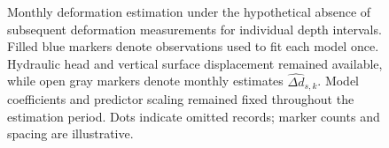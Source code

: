 \begin{figure}[htbp]
{
  }
  \caption{Monthly deformation estimation under the hypothetical absence of subsequent deformation measurements for individual depth intervals. Filled blue markers denote observations used to fit each model once. Hydraulic head and vertical surface displacement remained available, while open gray markers denote monthly estimates $\widehat{\Delta d}_{s,k}$. Model coefficients and predictor scaling remained fixed throughout the estimation period. Dots indicate omitted records; marker counts and spacing are illustrative.}
  \label{fig:no_subsequent_mlcw_design}
\end{figure}

\FloatBarrier
